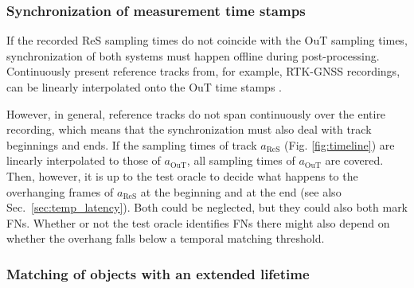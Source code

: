 \documentclass[conference]{IEEEtran}
\begin{document}


\subsubsection{Synchronization of measurement time stamps}
\label{sec:temp_sync}

If the recorded ReS sampling times do not coincide with the OuT sampling times, synchronization of both systems must happen offline during post-processing. %
Continuously present reference tracks from, for example, RTK-GNSS recordings, can be linearly interpolated onto the OuT time stamps \cite[Sec. 10.2.7]{Brahmi2020diss}.

However, in general, reference tracks do not span continuously over the entire recording, which means that the synchronization must also deal with track beginnings and ends. %
If the sampling times of track $a_\text{ReS}$ (Fig. \ref{fig:timeline}) are linearly interpolated to those of $a_\text{OuT}$, all sampling times of $a_\text{OuT}$ are covered. 
Then, however, it is up to the test oracle to decide what happens to the overhanging frames of $a_\text{ReS}$ at the beginning and at the end (see also Sec.~\ref{sec:temp_latency}). 
Both could be neglected, but they could also both mark FNs. 
Whether or not the test oracle identifies FNs there might also depend on whether the overhang falls below a temporal matching threshold. %



\subsubsection{Matching of objects with an extended lifetime}
\label{sec:temp_matching}
\end{document}
